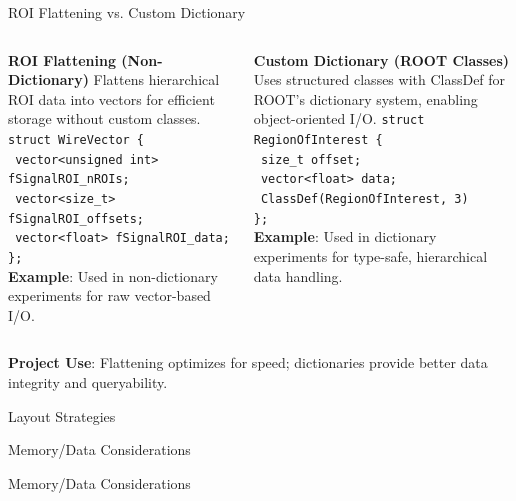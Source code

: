 \documentclass[aspectratio=169]{beamer}
\begin{document}
\begin{frame}{ROI Flattening vs. Custom Dictionary}
  \begin{columns}
    \textbf{ROI Flattening (Non-Dictionary)}
    \small Flattens hierarchical ROI data into vectors for efficient storage without custom classes.
    \vspace{0.5em}
    \texttt{struct WireVector \{} \\
    \texttt{    vector<unsigned int> fSignalROI\_nROIs;} \\
    \texttt{    vector<size\_t> fSignalROI\_offsets;} \\
    \texttt{    vector<float> fSignalROI\_data;} \\
    \texttt{\};} \\
    \vspace{0.5em}
    \textbf{Example}: Used in non-dictionary experiments for raw vector-based I/O.

    \textbf{Custom Dictionary (ROOT Classes)}
    \small Uses structured classes with ClassDef for ROOT's dictionary system, enabling object-oriented I/O.
    \vspace{0.5em}
    \texttt{struct RegionOfInterest \{} \\
    \texttt{    size\_t offset;} \\
    \texttt{    vector<float> data;} \\
    \texttt{    ClassDef(RegionOfInterest, 3)} \\
    \texttt{\};} \\
    \vspace{0.5em}
    \textbf{Example}: Used in dictionary experiments for type-safe, hierarchical data handling.
  \end{columns}
  \vspace{1em}
  \textbf{Project Use}: Flattening optimizes for speed; dictionaries provide better data integrity and queryability.
\end{frame}

\begin{frame}{Layout Strategies}
\end{frame}

\begin{frame}{Memory/Data Considerations}
\end{frame}

\begin{frame}{Memory/Data Considerations}
\end{frame}
\end{document}
